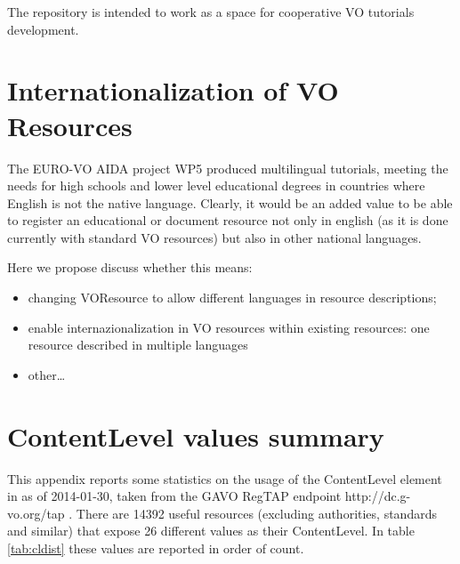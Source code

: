 \documentclass{ivoa}
\begin{document}
The repository is intended to work as a space for cooperative 
VO tutorials development.



\section{Internationalization of VO Resources}

\label{sect:lang}


The EURO-VO AIDA project WP5 produced multilingual tutorials, 
meeting the needs for high schools and lower level 
educational degrees in countries where English is not the native language. 
Clearly, it would be an added value to be able to register an educational or
document resource not only in english (as it is done currently with 
standard VO resources) but also in other national languages.



Here we propose discuss whether this means:

\begin{itemize}

\item changing VOResource to allow different languages in resource 
  descriptions;{}

\item enable internazionalization in VO resources within existing
  resources: one resource described in multiple languages{}

\item other\dots

\end{itemize}


\appendix

\section{ContentLevel values summary}

\label{app:clcurrval}


This appendix reports some statistics on the usage of the ContentLevel 
element in \citep{2008ivoa.spec.0222P} as of 2014-01-30, taken from the
GAVO RegTAP endpoint http://dc.g-vo.org/tap .
There are 14392 useful resources (excluding authorities, standards and
similar) that expose 26 different values as their ContentLevel.
In table \ref{tab:cldist} these values are reported in order of count.
\end{document}
